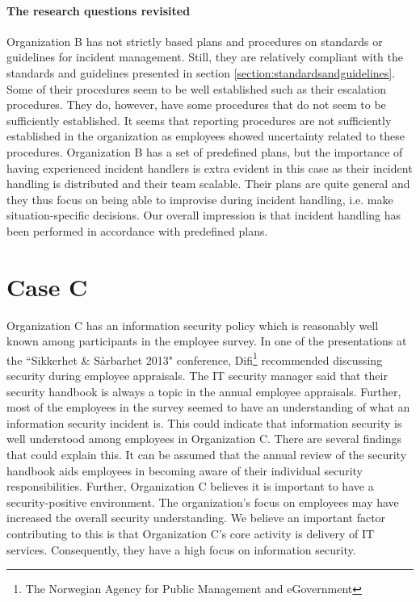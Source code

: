 \paragraph{The research questions revisited}
Organization B has not strictly based plans and procedures on standards or guidelines for incident management. Still, they are relatively compliant with the standards and guidelines presented in section \ref{section:standardsandguidelines}. Some of their procedures seem to be well established such as their escalation procedures. They do, however, have some procedures that do not seem to be sufficiently established. It seems that reporting procedures are not sufficiently established in the organization as employees showed uncertainty related to these procedures. Organization B has a set of predefined plans, but the importance of having experienced incident handlers is extra evident in this case as their incident handling is distributed and their team scalable. Their plans are quite general and they thus focus on being able to improvise during incident handling, i.e. make situation-specific decisions. Our overall impression is that incident handling has been performed in accordance with predefined plans.

\section{Case C}
\label{sec:discussionCaseC}
Organization C has an information security policy which is reasonably well known among participants in the employee survey. In one of the presentations at the ``Sikkerhet \& S\aa rbarhet 2013" conference, Difi\footnote{The Norwegian Agency for Public Management and eGovernment} recommended discussing security during employee appraisals. The IT security manager said that their security handbook is always a topic in the annual employee appraisals. Further, most of the employees in the survey seemed to have an understanding of what an information security incident is. This could indicate that information security is well understood among employees in Organization C. There are several findings that could explain this. It can be assumed that the annual review of the security handbook aids employees in becoming aware of their individual security responsibilities. Further, Organization C believes it is important to have a security-positive environment. The organization's focus on employees may have increased the overall security understanding. We believe an important factor contributing to this is that Organization C's core activity is delivery of IT services. Consequently, they have a high focus on information security.

